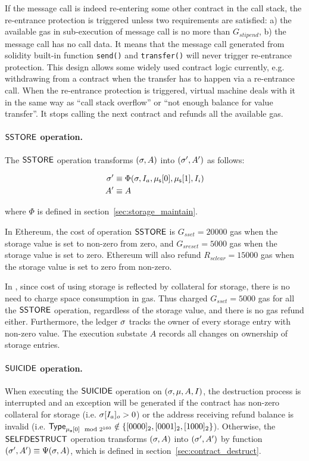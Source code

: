 If the message call is indeed re-entering some other contract in the call stack,
the re-entrance protection is triggered 
unless two requirements are satisfied: a) the available gas in sub-execution of message call is no more than $G_{stipend}$, 
b) the message call has no call data. 
It means that the message call generated from solidity built-in function {\tt send()} and {\tt transfer()} will never trigger
re-entrance protection. This design allows some widely used contract logic currently, 
e.g. withdrawing \cfx from a contract when the transfer has to happen via a re-entrance call. 
%
When the re-entrance protection is triggered, {\name} virtual machine deals with it in the same way as ``call stack overflow'' or ``not enough balance for value transfer''. It stops calling the next contract and refunds all the available gas.



\paragraph{$\mathsf{SSTORE}$ operation.} 
The $\mathsf{SSTORE}$ operation transforms $(\mathbf{\sigma},A)$ into $(\mathbf{\sigma}',A')$ as follows:

\begin{align}
	\mathbf{\sigma}'   &\equiv \Phi(\mathbf{\sigma},I_a, \mathbf{\mu}_{\sf s}[0],\mathbf{\mu}_{\sf s}[1],I_i) \\ 
	A'     &\equiv A
\end{align}

where $\Phi$ is defined in section~\ref{sec:storage_maintain}.

In Ethereum, the cost of operation $\mathsf{SSTORE}$ is $G_{sset}=20000$ gas when the storage value is set to non-zero from zero,
and  $G_{sreset}=5000$ gas when the storage value is set to zero. 
Ethereum will also refund $R_{sclear}=15000$ gas when the storage value is set to zero from non-zero. 

In {\name}, since cost of using storage is reflected by collateral for storage, there is no need to charge space consumption in gas. 
Thus {\name} charged $G_{sset}=5000$ gas for all the $\mathsf{SSTORE}$ operation, 
regardless of the storage value,
and there is no gas refund either. 
Furthermore, the {\name} ledger $\mathbf{\sigma}$ tracks the owner of every storage entry with non-zero value. 
The execution substate $A$ records all changes on ownership of storage entries. 

\paragraph{$\mathsf{SUICIDE}$ operation.} When executing the $\mathsf{SUICIDE}$ operation on $(\mathbf{\sigma},\mu,A,I)$, the destruction process is interrupted and an exception will be generated if the contract has non-zero collateral for storage (i.e. $\mathbf{\sigma}[I_a]_o>0$) or the address receiving refund balance is invalid (i.e. $\mathsf{Type}_{\mathbf{\mu}_{\mathbf{s}}[0]\mod2^{160}}\notin{\left \{{\ensuremath{[0000]_2},\ensuremath{[0001]_2},\ensuremath{[1000]_2}} \right \}}$). Otherwise, the $\mathsf{SELFDESTRUCT}$ operation transforms $(\mathbf{\sigma},A)$ into $(\mathbf{\sigma}',A')$ by function $(\mathbf{\sigma}',A')\equiv \Psi(\mathbf{\sigma},A)$, which is defined in section~\ref{sec:contract_destruct}. 

